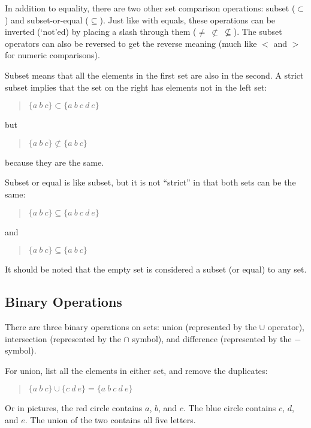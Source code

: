 \documentclass[letterpaper,12pt,openany,reqno]{book}%
\begin{document}
In addition to equality, there are two other set comparison operations: subset ($\subset$) and subset-or-equal ($\subseteq$). Just like with equals, these operations can be inverted (`not'ed) by placing a slash through them ($\neq \ \not \subset \ \nsubseteq$). The subset operators can also be reversed to get the reverse meaning (much like $<$ and $>$ for numeric comparisons).

Subset means that all the elements in the first set are also in the second. A strict subset implies that the set on the right has elements not in the left set:
\begin{quote}
$\{ a \ b \ c\} \subset \{ a \ b \ c \ d \ e \}$
\end{quote}
but
\begin{quote}
$\{ a \ b \ c\} \not \subset \{ a \ b \ c \}$
\end{quote}
because they are the same.

Subset or equal is like subset, but it is not ``strict'' in that both sets can be the same:
\begin{quote}
$\{ a \ b \ c\} \subseteq \{ a \ b \ c \ d \ e\}$
\end{quote}
and
\begin{quote}
$\{ a \ b \ c\} \subseteq \{ a \ b \ c \}$
\end{quote}

It should be noted that the empty set is considered a subset (or equal) to any set.

\subsection{Binary Operations}
There are three binary operations on sets: union (represented by the $\cup$ operator), intersection (represented by the $\cap$ symbol), and difference (represented by the $-$ symbol). 

For union, list all the elements in either set, and remove the duplicates:
\begin{quote}
$\{ a \ b \ c\} \cup \{ c \ d \ e\rbrace = \lbrace a \ b \ c \ d \ e\}$
\end{quote}

Or in pictures, the red circle contains $a$, $b$, and $c$. The blue circle contains $c$, $d$, and $e$. The union of the two contains all five letters.
\begin{center}
\end{center}
\end{document}
